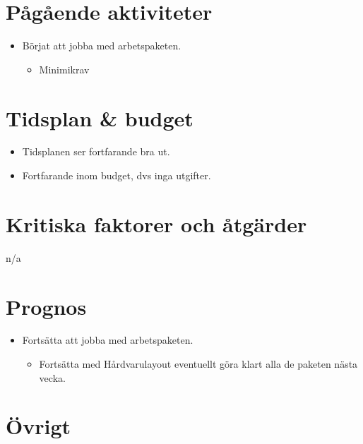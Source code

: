 \section{Pågående aktiviteter}
\begin{itemize}[noitemsep]
    \item Börjat att jobba med arbetspaketen.
    \begin{itemize}
    	\item Minimikrav
    \end{itemize}
\end{itemize}

\section{Tidsplan \& budget}
\begin{itemize}[noitemsep]
    \item Tidsplanen ser fortfarande bra ut.
    \item Fortfarande inom budget, dvs inga utgifter.
\end{itemize}

\section{Kritiska faktorer och åtgärder}
n/a

\section{Prognos}	
\begin{itemize}[noitemsep]
    \item Fortsätta att jobba med arbetspaketen.
    \begin{itemize}
    	\item Fortsätta med Hårdvarulayout eventuellt göra klart alla de paketen nästa vecka.
    \end{itemize}
\end{itemize}

\section{Övrigt}

